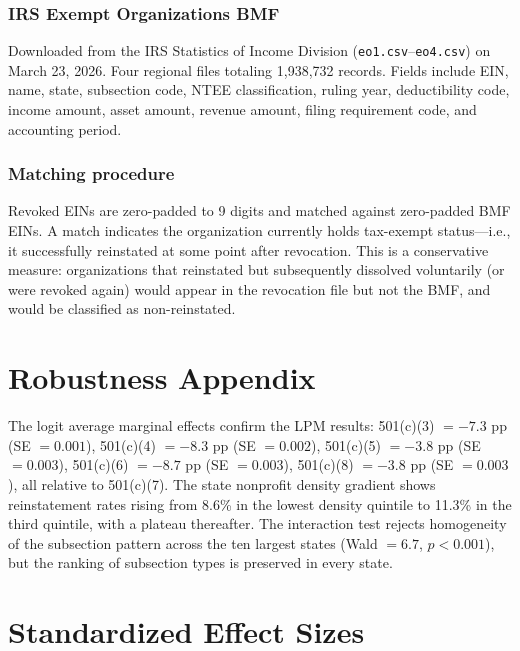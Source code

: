 \documentclass[12pt]{article}
\begin{document}
\subsubsection*{IRS Exempt Organizations BMF} Downloaded from the IRS Statistics of Income Division (\texttt{eo1.csv}--\texttt{eo4.csv}) on March 23, 2026. Four regional files totaling 1,938,732 records. Fields include EIN, name, state, subsection code, NTEE classification, ruling year, deductibility code, income amount, asset amount, revenue amount, filing requirement code, and accounting period.

\subsubsection*{Matching procedure} Revoked EINs are zero-padded to 9 digits and matched against zero-padded BMF EINs. A match indicates the organization currently holds tax-exempt status---i.e., it successfully reinstated at some point after revocation. This is a conservative measure: organizations that reinstated but subsequently dissolved voluntarily (or were revoked again) would appear in the revocation file but not the BMF, and would be classified as non-reinstated.

\section{Robustness Appendix}

The logit average marginal effects confirm the LPM results: 501(c)(3) $= -7.3$ pp (SE $= 0.001$), 501(c)(4) $= -8.3$ pp (SE $= 0.002$), 501(c)(5) $= -3.8$ pp (SE $= 0.003$), 501(c)(6) $= -8.7$ pp (SE $= 0.003$), 501(c)(8) $= -3.8$ pp (SE $= 0.003$), all relative to 501(c)(7). The state nonprofit density gradient shows reinstatement rates rising from 8.6\% in the lowest density quintile to 11.3\% in the third quintile, with a plateau thereafter. The interaction test rejects homogeneity of the subsection pattern across the ten largest states (Wald $= 6.7$, $p < 0.001$), but the ranking of subsection types is preserved in every state.

\section{Standardized Effect Sizes}
\label{sec:sde}


\end{document}
